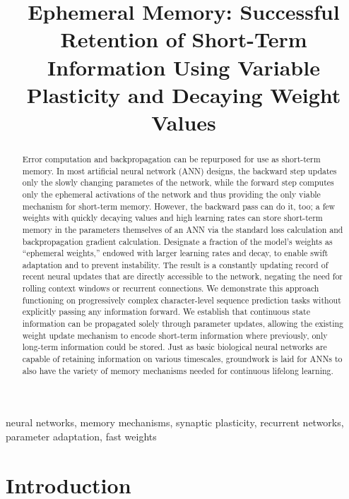 \documentclass[conference]{IEEEtran}
\title{Ephemeral Memory: Successful Retention of Short-Term Information Using Variable Plasticity and Decaying Weight Values}
\author{\IEEEauthorblockN{Jaden Lorenc}
\IEEEauthorblockA{\textit{Computer Science Department} \\
\textit{Brigham Young University}\\
Provo, USA \\
jaden.lorenc@byu.edu}
}
\begin{document}
\maketitle

\begin{abstract}
Error computation and backpropagation can be repurposed for use as short-term memory. In most artificial neural network (ANN) designs, the backward step updates only the slowly changing parametes of the network, while the forward step computes only the ephemeral activations of the network and thus providing the only viable mechanism for short-term memory. However, the backward pass can do it, too; a few weights with quickly decaying values and high learning rates can store short-term memory in the parameters themselves of an ANN via the standard loss calculation and backpropagation gradient calculation. Designate a fraction of the model's weights as “ephemeral weights,” endowed with larger learning rates and decay, to enable swift adaptation and to prevent instability. The result is a constantly updating record of recent neural updates that are directly accessible to the network, negating the need for rolling context windows or recurrent connections. We demonstrate this approach functioning on progressively complex character-level sequence prediction tasks without explicitly passing any information forward. We establish that continuous state information can be propagated solely through parameter updates, allowing the existing weight update mechanism to encode short-term information where previously, only long-term information could be stored. Just as basic biological neural networks are capable of retaining information on various timescales, groundwork is laid for ANNs to also have the variety of memory mechanisms needed for continuous lifelong learning.

\end{abstract}

\begin{IEEEkeywords}
neural networks, memory mechanisms, synaptic plasticity, recurrent networks, parameter adaptation, fast weights
\end{IEEEkeywords}

\section{Introduction}
 
\end{document}
